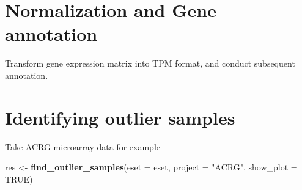 \documentclass[
  12pt,
]{book}
\newenvironment{Shaded}{\begin{snugshade}}{\end{snugshade}}
\newcommand{\AttributeTok}[1]{\textcolor[rgb]{0.13,0.29,0.53}{#1}}
\newcommand{\CommentTok}[1]{\textcolor[rgb]{0.56,0.35,0.01}{\textit{#1}}}
\newcommand{\ConstantTok}[1]{\textcolor[rgb]{0.56,0.35,0.01}{#1}}
\newcommand{\DecValTok}[1]{\textcolor[rgb]{0.00,0.00,0.81}{#1}}
\newcommand{\FunctionTok}[1]{\textcolor[rgb]{0.13,0.29,0.53}{\textbf{#1}}}
\newcommand{\NormalTok}[1]{#1}
\newcommand{\OtherTok}[1]{\textcolor[rgb]{0.56,0.35,0.01}{#1}}
\newcommand{\SpecialCharTok}[1]{\textcolor[rgb]{0.81,0.36,0.00}{\textbf{#1}}}
\newcommand{\StringTok}[1]{\textcolor[rgb]{0.31,0.60,0.02}{#1}}
\begin{document}
\hypertarget{normalization-and-gene-annotation}{%
\section{Normalization and Gene annotation}\label{normalization-and-gene-annotation}}

Transform gene expression matrix into TPM format, and conduct subsequent annotation.

\begin{Shaded}
\end{Shaded}

\hypertarget{identifying-outlier-samples}{%
\section{Identifying outlier samples}\label{identifying-outlier-samples}}

Take ACRG microarray data for example

\begin{Shaded}
\begin{Highlighting}[]
\NormalTok{res }\OtherTok{\textless{}{-}} \FunctionTok{find\_outlier\_samples}\NormalTok{(}\AttributeTok{eset =}\NormalTok{ eset, }\AttributeTok{project =} \StringTok{"ACRG"}\NormalTok{, }\AttributeTok{show\_plot =} \ConstantTok{TRUE}\NormalTok{)}
\end{Highlighting}
\end{Shaded}
\end{document}
